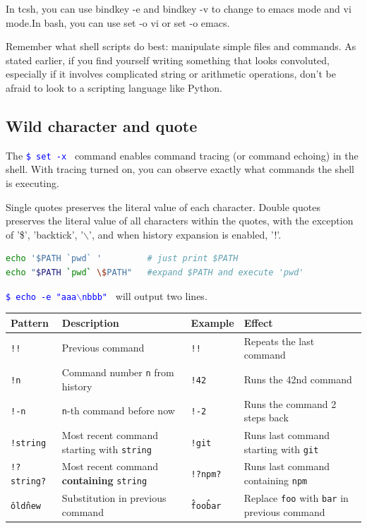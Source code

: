 \documentclass[paper=8.5in:11in, twoside, 12pt, pagesize=pdftex]{book}
\newcommand{\linuxcommand}[1]{\texttt{\textcolor{blue}{\$ #1 \Pisymbol{psy}{191}}}}
\begin{document}
	\par In tcsh, you can use bindkey -e and bindkey -v to change to emacs mode and vi mode.In bash, you can use set -o vi or set -o emacs.
	
	\par Remember what shell scripts do best: manipulate simple files and commands. As stated earlier, if you find yourself writing something that looks convoluted, especially if it involves complicated string or arithmetic operations, don’t be afraid to look to a scripting language like Python. 
	

\subsection{Wild character and quote}

	The \linuxcommand{set -x} command enables command tracing (or command echoing) in the shell. With tracing turned on, you can observe exactly what commands the shell is executing.

	Single quotes preserves the literal value of each character. Double quotes preserves the literal value of all characters within the quotes, with the exception of '\$', 'backtick', '$\backslash$', and when history expansion is enabled, '!'. 
\begin{lstlisting}[language=bash, mathescape = false]
echo '$PATH `pwd` '         # just print $PATH
echo "$PATH `pwd` \$PATH"   #expand $PATH and execute 'pwd'
\end{lstlisting}

\begin{center}
	
	\linuxcommand{echo -e "aaa$\backslash$nbbb"} will output two lines.
	
	\begin{tabular}{|p{}|p{}|p{}|p{}|}
		\hline
		\textbf{Pattern} & \textbf{Description} & \textbf{Example} & \textbf{Effect} \\
		\hline
		\texttt{!!} & Previous command & \texttt{!!} & Repeats the last command \\
		\hline
		\texttt{!n} & Command number \texttt{n} from history & \texttt{!42} & Runs the 42nd command \\
		\hline
		\texttt{!-n} & \texttt{n}-th command before now & \texttt{!-2} & Runs the command 2 steps back \\
		\hline
		\texttt{!string} & Most recent command starting with \texttt{string} & \texttt{!git} & Runs last command starting with \texttt{git} \\
		\hline
		\texttt{!?string?} & Most recent command \textbf{containing} \texttt{string} & \texttt{!?npm?} & Runs last command containing \texttt{npm} \\
		\hline
		\texttt{\^old\^new} & Substitution in previous command & \texttt{\^foo\^bar} & Replace \texttt{foo} with \texttt{bar} in previous command \\
		\hline
	\end{tabular}

\end{center}
\end{document}
